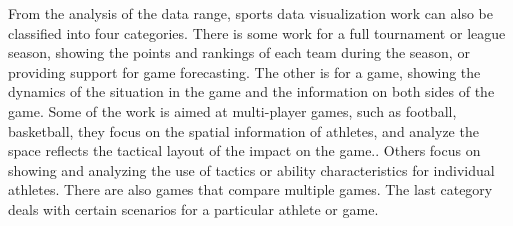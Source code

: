 \documentclass[journal]{vgtc}                %
\begin{document}
From the analysis of the data range, sports data visualization work can also be classified into four categories.
There is some work for a full tournament or league season, showing the points and rankings of each team during the season\cite{perin2016using}, or providing support for game forecasting\cite{vuillemot2016sports}.
The other is for a game, showing the dynamics of the situation in the game and the information on both sides of the game.
Some of the work is aimed at multi-player games, such as football, basketball, they focus on the spatial information of athletes, and analyze the space reflects the tactical layout of the impact on the game.\cite{sacha2014feature,perin2013soccerstories}.
Others focus on showing and analyzing the use of tactics or ability characteristics for individual athletes.\cite{polk2014tennivis,wu2018ittvis}
There are also games that compare multiple games. 
The last category deals with certain scenarios for a particular athlete or game.
\end{document}
